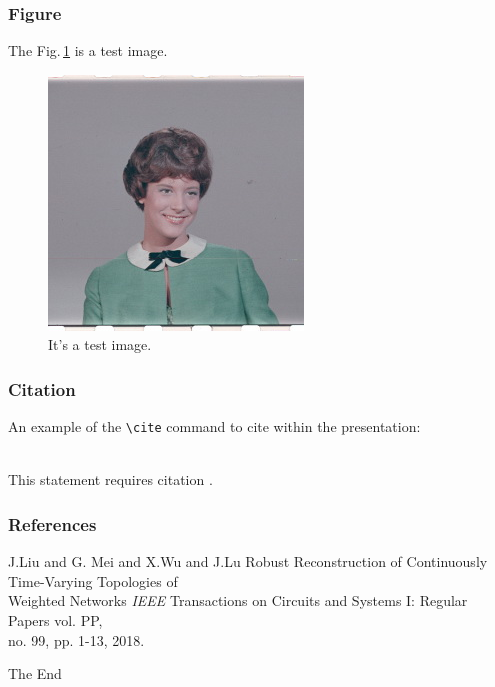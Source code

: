 \documentclass{beamer}
\begin{document}

\begin{frame}
\frametitle{Figure}
The Fig.\,\ref{fig:1} is a test image.
\begin{figure}
\includegraphics[width=0.5\linewidth]{test.jpg}
\caption{It's a test image.}
\label{fig:1}
\end{figure}
\end{frame}





\begin{frame}[fragile] %
\frametitle{Citation}
An example of the \verb|\cite| command to cite within the presentation:\\~

This statement requires citation \cite{p1}.
\end{frame}


\begin{frame}
\frametitle{References}
\begin{thebibliography}{99} %
 J.Liu and G. Mei and  X.Wu and J.Lu 
\newblock Robust Reconstruction of Continuously Time-Varying Topologies of \\Weighted Networks
\newblock \emph {IEEE} Transactions on Circuits and Systems I: Regular Papers vol. PP,\\no. 99, pp. 1-13, 2018.


\end{thebibliography}
\end{frame}


\begin{frame}
\Huge{\centerline{The End}}
\end{frame}

\end{document}
